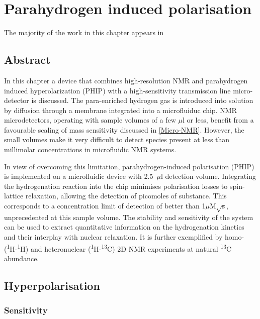 
\chapter{Parahydrogen induced polarisation} \label{Chapter:Parahydrogen}

 The majority of the work in this chapter appears in \citep{eills2019high}

\section{Abstract}
In this chapter a device that combines high-resolution NMR and parahydrogen induced hyperolarization (PHIP)
with a high-sensitivity transmission line micro-detector is discussed.
The para-enriched hydrogen gas is introduced into solution by diffusion
through a membrane integrated into a microfluiduc chip.
NMR microdetectors, operating with sample volumes of a few $\mu$l or less,
benefit from a favourable scaling of mass sensitivity discussed
in \ref{Micro-NMR}. However, the small volumes make it very difficult to
detect species present at less
than millimolar concentrations in microfluidic NMR systems.

In view of
overcoming this limitation, parahydrogen-induced polarisation
(PHIP) is implemented on a microfluidic device with 2.5~$\mu$l detection volume.
Integrating the hydrogenation reaction into the chip minimises polarisation
losses to spin-lattice relaxation, allowing the detection of picomoles of
substance. This corresponds to a concentration limit of detection of better than
1$\mu$M$\sqrt{\text{s}}$, unprecedented at this sample volume.  The
stability and sensitivity of the  system can be used to extract
quantitative information on the hydrogenation kinetics and
their interplay with nuclear relaxation. It is further exemplified by homo-
(\textsuperscript{1}H-\textsuperscript{1}H) and heteronuclear
(\textsuperscript{1}H-\textsuperscript{13}C) 2D NMR experiments
 at natural \textsuperscript{13}C abundance.

 \section{Hyperpolarisation}


 \subsection{Sensitivity}\label{Sensitivity}

